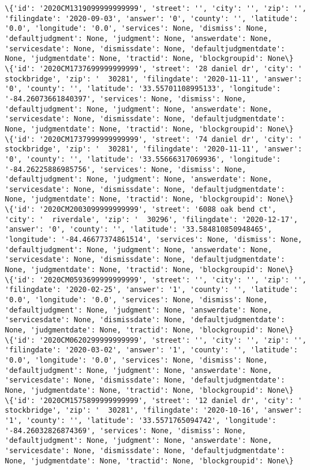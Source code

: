 \documentclass[11pt]{article}
\begin{document}
\begin{Verbatim}[commandchars=\\\{\}]
\{'id': '2020CM1319099999999999', 'street': '', 'city': '', 'zip': '', 'filingdate': '2020-09-03', 'answer': '0', 'county': '', 'latitude': '0.0', 'longitude': '0.0', 'services': None, 'dismiss': None, 'defaultjudgment': None, 'judgment': None, 'answerdate': None, 'servicesdate': None, 'dismissdate': None, 'defaultjudgmentdate': None, 'judgmentdate': None, 'tractid': None, 'blockgroupid': None\}
\{'id': '2020CM1737699999999999', 'street': '28 daniel dr', 'city': '  stockbridge', 'zip': '  30281', 'filingdate': '2020-11-11', 'answer': '0', 'county': '', 'latitude': '33.55701108995133', 'longitude': '-84.26073661840397', 'services': None, 'dismiss': None, 'defaultjudgment': None, 'judgment': None, 'answerdate': None, 'servicesdate': None, 'dismissdate': None, 'defaultjudgmentdate': None, 'judgmentdate': None, 'tractid': None, 'blockgroupid': None\}
\{'id': '2020CM1737999999999999', 'street': '74 daniel dr', 'city': '  stockbridge', 'zip': '  30281', 'filingdate': '2020-11-11', 'answer': '0', 'county': '', 'latitude': '33.55666317069936', 'longitude': '-84.26225886985756', 'services': None, 'dismiss': None, 'defaultjudgment': None, 'judgment': None, 'answerdate': None, 'servicesdate': None, 'dismissdate': None, 'defaultjudgmentdate': None, 'judgmentdate': None, 'tractid': None, 'blockgroupid': None\}
\{'id': '2020CM2003099999999999', 'street': '6088 oak bend ct', 'city': '  riverdale', 'zip': '  30296', 'filingdate': '2020-12-17', 'answer': '0', 'county': '', 'latitude': '33.584810850948465', 'longitude': '-84.46677374861514', 'services': None, 'dismiss': None, 'defaultjudgment': None, 'judgment': None, 'answerdate': None, 'servicesdate': None, 'dismissdate': None, 'defaultjudgmentdate': None, 'judgmentdate': None, 'tractid': None, 'blockgroupid': None\}
\{'id': '2020CM0593699999999999', 'street': '', 'city': '', 'zip': '', 'filingdate': '2020-02-25', 'answer': '1', 'county': '', 'latitude': '0.0', 'longitude': '0.0', 'services': None, 'dismiss': None, 'defaultjudgment': None, 'judgment': None, 'answerdate': None, 'servicesdate': None, 'dismissdate': None, 'defaultjudgmentdate': None, 'judgmentdate': None, 'tractid': None, 'blockgroupid': None\}
\{'id': '2020CM0620299999999999', 'street': '', 'city': '', 'zip': '', 'filingdate': '2020-03-02', 'answer': '1', 'county': '', 'latitude': '0.0', 'longitude': '0.0', 'services': None, 'dismiss': None, 'defaultjudgment': None, 'judgment': None, 'answerdate': None, 'servicesdate': None, 'dismissdate': None, 'defaultjudgmentdate': None, 'judgmentdate': None, 'tractid': None, 'blockgroupid': None\}
\{'id': '2020CM1575899999999999', 'street': '12 daniel dr', 'city': '  stockbridge', 'zip': '  30281', 'filingdate': '2020-10-16', 'answer': '1', 'county': '', 'latitude': '33.5571765094742', 'longitude': '-84.26032826874369', 'services': None, 'dismiss': None, 'defaultjudgment': None, 'judgment': None, 'answerdate': None, 'servicesdate': None, 'dismissdate': None, 'defaultjudgmentdate': None, 'judgmentdate': None, 'tractid': None, 'blockgroupid': None\}

\end{Verbatim}
\end{document}
